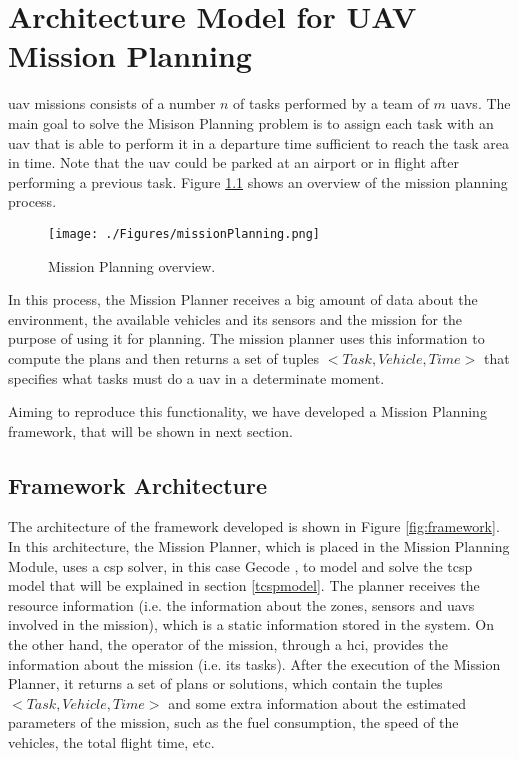 
\chapter{Architecture Model for UAV Mission Planning} %
\label{Chapter3}

\gls{uav} missions consists of a number $n$ of tasks performed by a team of $m$ \glspl{uav}. The main goal to solve the Misison Planning problem is to assign each task with an \gls{uav} that is able to perform it in a departure time sufficient to reach the task area in time. Note that the \gls{uav} could be parked at an airport or in flight after performing a previous task. %
Figure \ref{fig:missionPlanning} shows an overview of the mission planning process.

\begin{figure}[h]
\centering
\texttt{[image: ./Figures/missionPlanning.png]}
\caption{Mission Planning overview.}
\label{fig:missionPlanning}
\end{figure}

In this process, the Mission Planner receives a big amount of data about the environment, the available vehicles and its sensors and the mission for the purpose of using it for planning. The mission planner uses this information to compute the plans and then returns a set of tuples $<Task, Vehicle, Time>$ that specifies what tasks must do a \gls{uav} in a determinate moment.

Aiming to reproduce this functionality, we have developed a Mission Planning framework, that will be shown in next section.


\section{Framework Architecture}\label{architecture}
The architecture of the framework developed is shown in Figure \ref{fig:framework}. In this architecture, the Mission Planner, which is placed in the Mission Planning Module, uses a \gls{csp} solver, in this case Gecode \cite{SchulteEtAl2010}, to model and solve the \gls{tcsp} model that will be explained in section \ref{tcspmodel}. The planner receives the resource information (i.e. the information about the zones, sensors and \glspl{uav} involved in the mission), which is a static information stored in the system. On the other hand, the operator of the mission, through a \gls{hci}, provides the information about the mission (i.e. its tasks). After the execution of the Mission Planner, it returns a set of plans or solutions, which contain the tuples $<Task, Vehicle, Time>$ and some extra information about the estimated parameters of the mission, such as the fuel consumption, the speed of the vehicles, the total flight time, etc.


